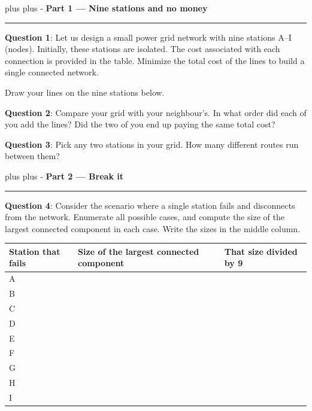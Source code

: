 \documentclass[a4paper, 14pt]{extarticle}
\newcommand{\needroom}[1]{%
  \par
  \begingroup
    \setlength{\dimen0}{#1}%
    \vskip 0pt plus \dimen0
    \penalty -100%
    \vskip 0pt plus -\dimen0
  \endgroup}
\newcommand{\parthead}[2]{%
  \needroom{6\baselineskip}%
  \partheadhere{#1}{#2}}
\newcommand{\partheadhere}[2]{%
  \vspace{0.5em}
  {\large\bfseries Part #1 --- #2}\par
  \vspace{-0.4em}\rule{\textwidth}{0.8pt}\par
  \vspace{0.1em}}
\begin{document}
\parthead{1}{Nine stations and no money}

\begin{minipage}{0.52\textwidth}
    {\bf Question 1}:
    Let us design a small power grid network with nine stations A--I (nodes).
    Initially, these stations are isolated.
    The cost associated with each connection is provided in the table.
    Minimize the total cost of the lines to build a single connected network.

    Draw your lines on the nine stations below.
\end{minipage}
\hfill
\begin{minipage}{0.46\textwidth}
\begin{center}
\end{center}
\end{minipage}

\begin{center}
\end{center}

{\bf Question 2}:
Compare your grid with your neighbour's.
In what order did each of you add the lines?
Did the two of you end up paying the same total cost?

{\bf Question 3}:
Pick any two stations in your grid.
How many different routes run between them?

\parthead{2}{Break it}

\begin{minipage}{\textwidth}
{\bf Question 4}:
Consider the scenario where a single station fails and disconnects from the network.
Enumerate all possible cases, and compute the size of the largest connected component in each case.
Write the sizes in the middle column.

\begin{center}
\begin{tabular}{|C{3.6cm}|C{4.6cm}|C{4.2cm}|}
\hline
Station that fails & Size of the largest connected component & That size divided by 9 \\ \hline
A & & \\[0.76cm] \hline
B & & \\[0.76cm] \hline
C & & \\[0.76cm] \hline
D & & \\[0.76cm] \hline
E & & \\[0.76cm] \hline
F & & \\[0.76cm] \hline
G & & \\[0.76cm] \hline
H & & \\[0.76cm] \hline
I & & \\[0.76cm] \hline
\end{tabular}
\end{center}
\end{minipage}
\end{document}
